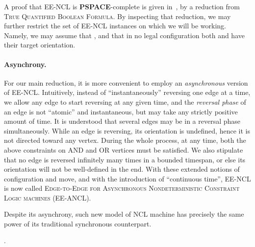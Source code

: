 \documentclass{style}
\newcommand{\complexityclass}[1]{\textbf{#1}}
\newcommand{\computproblem}[1]{\textsc{#1}}
\newcommand{\PSPACE}{\complexityclass{PSPACE}\xspace}
\newcommand{\EENCL}{\computproblem{EE-NCL}\xspace}
\newcommand{\EEANCL}{\computproblem{EE-ANCL}\xspace}
\begin{document}
A proof that \EENCL is \PSPACE-complete is given in~\cite{ncl}, by a reduction from \computproblem{True Quantified Boolean Formula}. By inspecting that reduction, we may further restrict the set of \EENCL instances on which we will be working. Namely, we may assume that , and that in no legal configuration both  and  have their target orientation.

\paragraph{Asynchrony.}

For our main reduction, it is more convenient to employ an \emph{asynchronous} version of \EENCL. Intuitively, instead of ``instantaneously'' reversing one edge at a time, we allow any edge to start reversing at any given time, and the \emph{reversal phase} of an edge is not ``atomic'' and instantaneous, but may take any strictly positive amount of time. It is understood that several edges may be in a reversal phase simultaneously. While an edge is reversing, its orientation is undefined, hence it is not directed toward any vertex. During the whole process, at any time, both the above constraints on AND and OR vertices must be satisfied. We also stipulate that no edge is reversed infinitely many times in a bounded timespan, or else its orientation will not be well-defined in the end. With these extended notions of configuration and move, and with the introduction of ``continuous time'', \EENCL is now called \computproblem{Edge-to-Edge for Asynchronous Nondeterministic Constraint Logic machines} (\EEANCL).

Despite its asynchrony, such new model of NCL machine has precisely the same power of its traditional synchronous counterpart.

\begin{theorem}\label{asynch}.\end{theorem}
\end{document}
